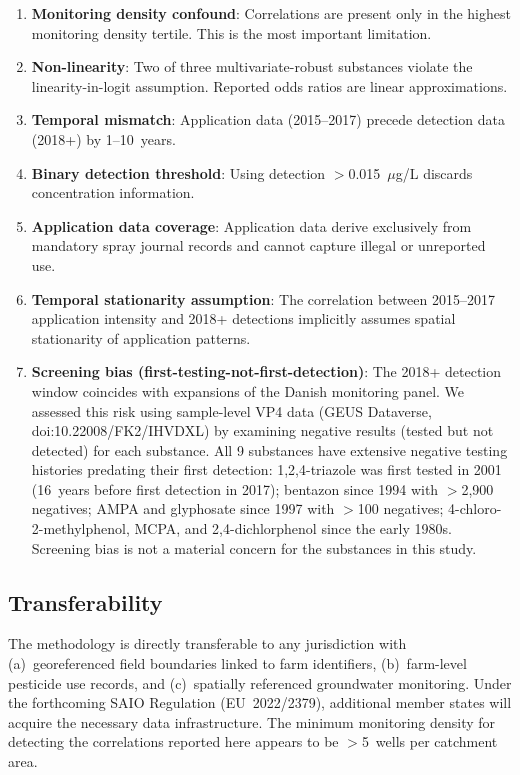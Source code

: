 \documentclass[12pt,a4paper]{article}
\begin{document}
\begin{enumerate}
\item \textbf{Monitoring density confound}: Correlations are present only in the highest monitoring density tertile. This is the most important limitation.

\item \textbf{Non-linearity}: Two of three multivariate-robust substances violate the linearity-in-logit assumption. Reported odds ratios are linear approximations.

\item \textbf{Temporal mismatch}: Application data (2015--2017) precede detection data (2018+) by 1--10~years.

\item \textbf{Binary detection threshold}: Using detection $>$0.015~$\mu$g/L discards concentration information.

\item \textbf{Application data coverage}: Application data derive exclusively from mandatory spray journal records and cannot capture illegal or unreported use.

\item \textbf{Temporal stationarity assumption}: The correlation between 2015--2017 application intensity and 2018+ detections implicitly assumes spatial stationarity of application patterns.

\item \textbf{Screening bias (first-testing-not-first-detection)}: The 2018+ detection window coincides with expansions of the Danish monitoring panel. We assessed this risk using sample-level VP4 data (GEUS Dataverse, doi:10.22008/FK2/IHVDXL) by examining negative results (tested but not detected) for each substance. All 9 substances have extensive negative testing histories predating their first detection: 1,2,4-triazole was first tested in 2001 (16~years before first detection in 2017); bentazon since 1994 with ${>}$2,900 negatives; AMPA and glyphosate since 1997 with ${>}$100 negatives; 4-chloro-2-methylphenol, MCPA, and 2,4-dichlorphenol since the early 1980s. Screening bias is not a material concern for the substances in this study.
\end{enumerate}

\subsection{Transferability}

The methodology is directly transferable to any jurisdiction with (a)~georeferenced field boundaries linked to farm identifiers, (b)~farm-level pesticide use records, and (c)~spatially referenced groundwater monitoring. Under the forthcoming SAIO Regulation (EU~2022/2379), additional member states will acquire the necessary data infrastructure. The minimum monitoring density for detecting the correlations reported here appears to be $>$5~wells per catchment area.
\end{document}
